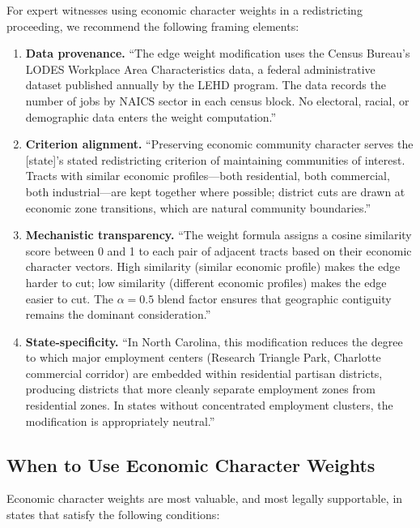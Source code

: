 For expert witnesses using economic character weights in a redistricting
proceeding, we recommend the following framing elements:

\begin{enumerate}
  \item \textbf{Data provenance.} ``The edge weight modification uses the
    Census Bureau's LODES Workplace Area Characteristics data, a federal
    administrative dataset published annually by the LEHD program.
    The data records the number of jobs by NAICS sector in each census block.
    No electoral, racial, or demographic data enters the weight computation.''

  \item \textbf{Criterion alignment.} ``Preserving economic community character
    serves the [state]'s stated redistricting criterion of maintaining
    communities of interest.
    Tracts with similar economic profiles---both residential, both commercial,
    both industrial---are kept together where possible; district cuts are
    drawn at economic zone transitions, which are natural community boundaries.''

  \item \textbf{Mechanistic transparency.} ``The weight formula assigns
    a cosine similarity score between 0 and 1 to each pair of adjacent tracts
    based on their economic character vectors.
    High similarity (similar economic profile) makes the edge harder to cut;
    low similarity (different economic profiles) makes the edge easier to cut.
    The $\alpha = 0.5$ blend factor ensures that geographic contiguity
    remains the dominant consideration.''

  \item \textbf{State-specificity.} ``In North Carolina, this modification
    reduces the degree to which major employment centers (Research Triangle
    Park, Charlotte commercial corridor) are embedded within residential
    partisan districts, producing districts that more cleanly separate
    employment zones from residential zones.
    In states without concentrated employment clusters, the modification
    is appropriately neutral.''
\end{enumerate}

\subsection{When to Use Economic Character Weights}

Economic character weights are most valuable, and most legally supportable,
in states that satisfy the following conditions:

